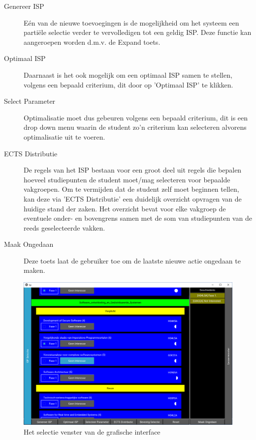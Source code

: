 \begin{description}
\item [Genereer ISP] E\'{e}n van de nieuwe toevoegingen is de mogelijkheid om het systeem een parti\"{e}le selectie verder te vervolledigen tot een geldig ISP. Deze functie kan aangeroepen worden d.m.v. de Expand toets.
\item[Optimaal ISP] Daarnaast is het ook mogelijk om een optimaal ISP samen te stellen, volgens een bepaald criterium, dit door op 'Optimaal ISP' te klikken.
\item[Select Parameter] Optimalisatie moet dus gebeuren volgens een bepaald criterium, dit is een drop down menu waarin de student zo'n criterium kan selecteren alvorens optimalisatie uit te voeren.
\item[ECTS Distributie] De regels van het ISP bestaan voor een groot deel uit regels die bepalen hoeveel studiepunten de student moet/mag selecteren voor bepaalde vakgroepen. Om te vermijden dat de student zelf moet beginnen tellen, kan deze via 'ECTS Distributie' een duidelijk overzicht opvragen van de huidige stand der zaken. Het overzicht bevat voor elke vakgroep de eventuele onder- en bovengrens samen met de som van studiepunten van de reeds geselecteerde vakken.
\item[Maak Ongedaan] Deze toets laat de gebruiker toe om de laatste nieuwe actie ongedaan te maken. 
\end{description}

\begin{figure}
\caption{Het selectie venster van de grafische interface\label{fig:sc1}}
\centering
\includegraphics[scale=.35]{sc1.png}
\end{figure}

